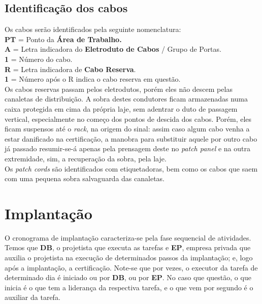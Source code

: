 \documentclass[	DIV=calc,%
							paper=a4,%
							fontsize=12pt,%
							onecolumn]{scrartcl}	 					%
\begin{document}
\clearpage
\thispagestyle{plain}

\recalctypearea

{\centering

}

\clearpage
{}
\recalctypearea

\subsection{Identificação dos cabos}

Os cabos serão identificados pela seguinte nomenclatura:
\\

\textbf{PT} = Ponto da \textbf{Área de Trabalho.}
\\

\textbf{A} = Letra indicadora do \textbf{Eletroduto de Cabos} / Grupo de Portas.
\\

\textbf{1} = Número do cabo.
\\

\textbf{R} = Letra indicadora de \textbf{Cabo Reserva}.
\\

\textbf{1} = Número após o R indica o cabo reserva em questão.
\\

Os cabos reservas passam pelos eletrodutos, porém eles não descem pelas canaletas de distribuição. A sobra destes condutores ficam armazenadas numa caixa protegida em cima da própria laje, sem adentrar o duto de passagem vertical, especialmente no começo dos pontos de descida dos cabos. Porém, eles ficam suspensos até o \textit{rack}, na origem do sinal: assim caso algum cabo venha a estar danificado na certificação, a manobra para substituir aquele por outro cabo já passado resumir-se-á apenas pela prensagem deste no \textit{patch panel} e na outra extremidade, sim, a recuperação da sobra, pela laje.
\\

Os \textit{patch cords} são identificados com etiquetadoras, bem como os cabos que saem com uma pequena sobra salvaguarda das canaletas.

\section{Implantação}

O cronograma de implantação caracteriza-se pela fase sequencial de atividades. Temos que \textbf{DB}, o projetista que executa as tarefas e \textbf{EP}, empresa privada que auxilia o projetista na execução de determinados passos da implantação; e, logo após a implantação, a certificação. Note-se que por vezes, o executor da tarefa de determinado dia é iniciado ou por \textbf{DB}, ou por \textbf{EP}. No caso que questão, o que inicia é o que tem a liderança da respectiva tarefa, e o que vem por segundo é o auxiliar da tarefa.
\\
\end{document}
